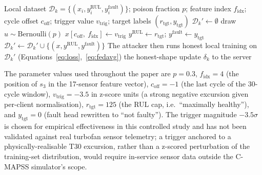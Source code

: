 \documentclass[a4paper,fleqn,doubleblind]{cas-sc}
\begin{document}
\begin{algorithm}[!ht]
\caption{Sensor-value backdoor injection at malicious client $k$.}
\label{alg:backdoor}
\begin{algorithmic}[1]
\Require Local dataset $\mathcal{D}_k = \{(x_i, y^{\mathrm{RUL}}_i, y^{\mathrm{fault}}_i)\}$; poison fraction $p$; feature index $f_{\mathrm{idx}}$; cycle offset $c_{\mathrm{off}}$; trigger value $v_{\mathrm{trig}}$; target labels $(r_{\mathrm{tgt}}, y_{\mathrm{tgt}})$
\State $\mathcal{D}_k' \gets \emptyset$
    \State draw $u \sim \mathrm{Bernoulli}(p)$ 
        \State $x[c_{\mathrm{off}},\ f_{\mathrm{idx}}] \gets v_{\mathrm{trig}}$ 
        \State $y^{\mathrm{RUL}} \gets r_{\mathrm{tgt}}$; \quad $y^{\mathrm{fault}} \gets y_{\mathrm{tgt}}$ 
    \EndIf
    \State $\mathcal{D}_k' \gets \mathcal{D}_k' \cup \{(x, y^{\mathrm{RUL}}, y^{\mathrm{fault}})\}$
\EndFor
\State The attacker then runs honest local training on $\mathcal{D}_k'$ (Equations~\ref{eq:loss},~\ref{eq:fedavg})
\State \Return the honest-shape update $\delta_k$ to the server
\end{algorithmic}
\end{algorithm}

The parameter values used throughout the paper are $p = 0.3$,
$f_{\mathrm{idx}} = 4$ (the position of $s_3$ in the 17-sensor
feature vector), $c_{\mathrm{off}} = -1$ (the last cycle of the
30-cycle window), $v_{\mathrm{trig}} = -3.5$ in z-score units
(a strong negative excursion given per-client normalisation),
$r_{\mathrm{tgt}} = 125$ (the RUL cap, i.e.\ ``maximally healthy''),
and $y_{\mathrm{tgt}} = 0$ (fault head rewritten to ``not faulty'').
The trigger magnitude $-3.5\sigma$ is chosen for empirical
effectiveness in this controlled study and has not been validated
against real turbofan sensor telemetry; a trigger anchored to a
physically-realisable T30 excursion, rather than a z-scored
perturbation of the training-set distribution, would require
in-service sensor data outside the C-MAPSS simulator's scope.
\end{document}
